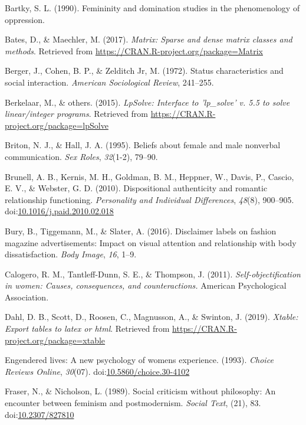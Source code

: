 \documentclass[man]{apa6}
\begin{document}
\hypertarget{ref-Bartky}{}
Bartky, S. L. (1990). Femininity and domination studies in the
phenomenology of oppression.

\hypertarget{ref-R-Matrix}{}
Bates, D., \& Maechler, M. (2017). \emph{Matrix: Sparse and dense matrix
classes and methods}. Retrieved from
\url{https://CRAN.R-project.org/package=Matrix}

\hypertarget{ref-berger1972}{}
Berger, J., Cohen, B. P., \& Zelditch Jr, M. (1972). Status
characteristics and social interaction. \emph{American Sociological
Review}, 241--255.

\hypertarget{ref-R-lpSolve}{}
Berkelaar, M., \& others. (2015). \emph{LpSolve: Interface to
'lp\_solve' v. 5.5 to solve linear/integer programs}. Retrieved from
\url{https://CRAN.R-project.org/package=lpSolve}

\hypertarget{ref-briton1995}{}
Briton, N. J., \& Hall, J. A. (1995). Beliefs about female and male
nonverbal communication. \emph{Sex Roles}, \emph{32}(1-2), 79--90.

\hypertarget{ref-brunelletal2010}{}
Brunell, A. B., Kernis, M. H., Goldman, B. M., Heppner, W., Davis, P.,
Cascio, E. V., \& Webster, G. D. (2010). Dispositional authenticity and
romantic relationship functioning. \emph{Personality and Individual
Differences}, \emph{48}(8), 900--905.
doi:\href{https://doi.org/10.1016/j.paid.2010.02.018}{10.1016/j.paid.2010.02.018}

\hypertarget{ref-bury2016}{}
Bury, B., Tiggemann, M., \& Slater, A. (2016). Disclaimer labels on
fashion magazine advertisements: Impact on visual attention and
relationship with body dissatisfaction. \emph{Body Image}, \emph{16},
1--9.

\hypertarget{ref-calogero2011}{}
Calogero, R. M., Tantleff-Dunn, S. E., \& Thompson, J. (2011).
\emph{Self-objectification in women: Causes, consequences, and
counteractions.} American Psychological Association.

\hypertarget{ref-R-xtable}{}
Dahl, D. B., Scott, D., Roosen, C., Magnusson, A., \& Swinton, J.
(2019). \emph{Xtable: Export tables to latex or html}. Retrieved from
\url{https://CRAN.R-project.org/package=xtable}

\hypertarget{ref-Kaschak}{}
Engendered lives: A new psychology of womens experience. (1993).
\emph{Choice Reviews Online}, \emph{30}(07).
doi:\href{https://doi.org/10.5860/choice.30-4102}{10.5860/choice.30-4102}

\hypertarget{ref-frasernicholson1989}{}
Fraser, N., \& Nicholson, L. (1989). Social criticism without
philosophy: An encounter between feminism and postmodernism.
\emph{Social Text}, (21), 83.
doi:\href{https://doi.org/10.2307/827810}{10.2307/827810}
\end{document}
